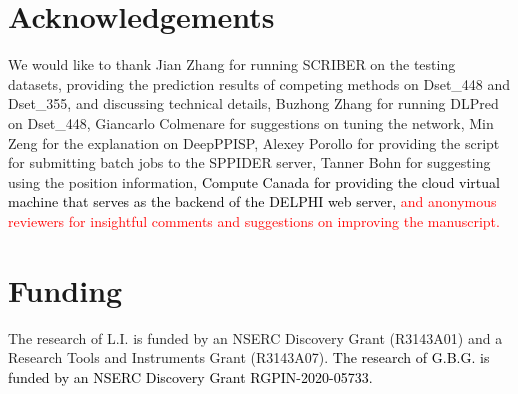 \documentclass{bioinfo}
\newcommand{\mySecondColor}{black}
\newcommand{\mythirdColor}{red}
\begin{document}
\section*{Acknowledgements}
We would like to thank Jian Zhang for running SCRIBER on the testing datasets, providing the prediction results of competing methods on Dset\_448 and Dset\_355, and discussing technical details, Buzhong Zhang for running DLPred on Dset\_448, Giancarlo Colmenare for suggestions on tuning the network, Min Zeng for the explanation on DeepPPISP, Alexey Porollo for providing the script for submitting batch jobs to the SPPIDER server, Tanner Bohn for suggesting using the position information, \textcolor{\mySecondColor}{Compute Canada for providing the cloud virtual machine that serves as the backend of the DELPHI web server, \textcolor{\mythirdColor}{and anonymous reviewers for insightful comments and suggestions on improving the manuscript.}}

\section*{Funding}
The research of L.I. is funded by an NSERC Discovery Grant (R3143A01) and a Research Tools and Instruments Grant (R3143A07). \textcolor{\mySecondColor}{The research of G.B.G. is funded by an NSERC Discovery Grant RGPIN-2020-05733.}



%

\end{document}
